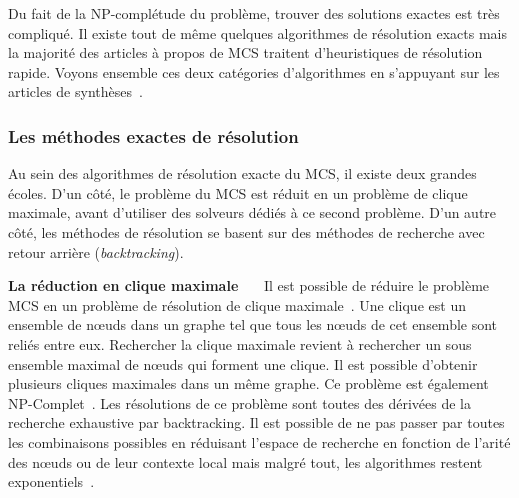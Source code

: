 Du fait de la NP-complétude du problème, trouver des solutions exactes est très compliqué.
Il existe tout de même quelques algorithmes de résolution exacts mais la majorité des articles à propos de MCS traitent d'heuristiques de résolution rapide.
Voyons ensemble ces deux catégories d'algorithmes en s'appuyant sur les articles de synthèses~\cite{raymond_maximum_2002, ehrlich_maximum_2011}.


\subsubsection{Les méthodes exactes de résolution}

Au sein des algorithmes de résolution exacte du MCS, il existe deux grandes écoles.
D'un côté, le problème du MCS est réduit en un problème de clique maximale, avant d'utiliser des solveurs dédiés à ce second problème.
D'un autre côté, les méthodes de résolution se basent sur des méthodes de recherche avec retour arrière (\textit{backtracking}).



\textbf{La réduction en clique maximale}~~~
Il est possible de réduire le problème MCS en un problème de résolution de clique maximale~\cite{pelillo_matching_1999,grosso_simple_2008,rahman_small_2009}.
Une clique est un ensemble de n\oe{}uds dans un graphe tel que tous les n\oe{}uds de cet ensemble sont reliés entre eux.
Rechercher la clique maximale revient à rechercher un sous ensemble maximal de n\oe{}uds qui forment une clique.
Il est possible d'obtenir plusieurs cliques maximales dans un même graphe.
Ce problème est également NP-Complet~\cite{akkoyunlu_enumeration_1973}.
Les résolutions de ce problème sont toutes des dérivées de la recherche exhaustive par backtracking.
Il est possible de ne pas passer par toutes les combinaisons possibles en réduisant l'espace de recherche en fonction de l'arité des n\oe{}uds ou de leur contexte local mais malgré tout, les algorithmes restent exponentiels~\cite{tomita_worst-case_2004}.


